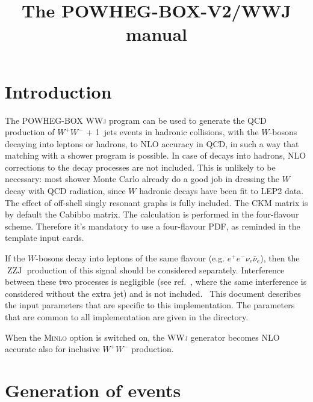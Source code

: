 \documentclass{article}
\newcommand{\tmop}[1]{\ensuremath{\operatorname{#1}}}
\newcommand{\tmtexttt}[1]{{\ttfamily{#1}}}
\newcommand{\noun}[1]{\textsc{#1}}
\newcommand{\WWJ}{\noun{WWj}}
\newcommand{\MINLO}{\noun{Minlo}}
\begin{document}
\title{The POWHEG-BOX-V2/WWJ manual}

\maketitle

\section{Introduction}

The POWHEG-BOX \WWJ{} program {\cite{Hamilton:2016bfu}} can be used to generate the
QCD production of $W^+ W^-$ + 1~jets events in hadronic collisions,
with the $W$-bosons decaying into leptons or hadrons, to NLO accuracy
in QCD, in such a way that matching with a shower program is
possible. In case of decays into hadrons, NLO corrections to the decay
processes are not included. This is unlikely to be necessary: most
shower Monte Carlo already do a good job in dressing the $W$ decay
with QCD radiation, since $W$ hadronic decays have been fit to LEP2
data. The effect of off-shell singly resonant graphs is fully
included. The CKM matrix is by default the Cabibbo matrix. The
calculation is performed in the four-flavour scheme. Therefore it's
mandatory to use a four-flavour PDF, as reminded in the template input
cards.

If the $W$-bosons decay into leptons of the same flavour (e.g. $e^+ e^- \nu_e
\bar{\nu}_e$), then the $\tmop{ZZJ}$ production of this signal should be
considered separately. Interference between
these two processes is negligible (see ref.~\cite{Melia:2011tj}, where the same interference is considered without the extra jet) and is not included. \
This document describes the input parameters that are specific to this
implementation. The parameters that are common to all \tmtexttt{POWHEG BOX}
implementation are given in the \tmtexttt{POWHEG-BOX-V2/Docs} directory. 

When the \MINLO{} option is switched on, the \WWJ{} generator becomes
NLO accurate also for inclusive $W^+ W^-$ production. 


\section{Generation of events}
\end{document}
